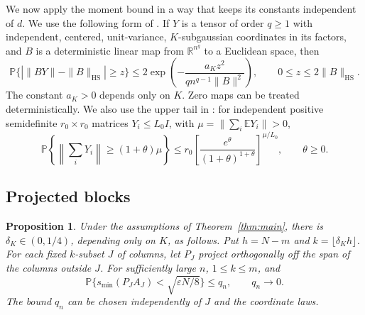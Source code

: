 \documentclass[11pt]{article}
\newtheorem{proposition}[theorem]{Proposition}
\newcommand{\R}{\mathbb R}
\newcommand{\E}{\mathbb E}
\newcommand{\Prob}{\mathbb P}
\newcommand{\HS}{\mathrm{HS}}
\begin{document}
We now apply the moment bound in a way that keeps its constants
independent of \(d\). We use the following form of
\cite[Theorem 1.4]{Vershynin}.
If \(Y\) is a tensor of order \(q\ge1\) with independent, centered,
unit-variance, \(K\)-subgaussian coordinates in its factors, and \(B\)
is a deterministic linear map from \(\R^{n^q}\) to a Euclidean
space, then
\begin{equation}\label{eq:tensor-concentration}
 \Prob\{|\|BY\|-\|B\|_{\HS}|\ge z\}
 \le2\exp\!\left(-\frac{a_K z^2}
                       {q n^{q-1}\|B\|^2}\right),
 \qquad 0\le z\le2\|B\|_{\HS}.
\end{equation}
The constant \(a_K>0\) depends only on \(K\).
Zero maps can be treated deterministically.
We also use the upper tail in
\cite[Theorem 5.1.1]{Tropp}: for independent positive semidefinite
\(r_0\times r_0\) matrices \(Y_i\le L_0I\), with
\(\mu=\|\sum_i\E Y_i\|>0\),
\begin{equation}\label{eq:cher}
 \Prob\!\left\{\left\|\sum_iY_i\right\|
                    \ge(1+\theta)\mu\right\}
 \le r_0\left[\frac{e^\theta}
                   {(1+\theta)^{1+\theta}}\right]^{\mu/L_0},
 \qquad \theta\ge0.
\end{equation}

\subsection{Projected blocks}

\begin{proposition}\label{prop:block}
Under the assumptions of Theorem~\ref{thm:main}, there is
\(\delta_K\in(0,1/4)\), depending only on \(K\), as follows.
Put \(h=N-m\) and \(k=\lfloor\delta_K h\rfloor\).
For each fixed \(k\)-subset \(J\) of columns, let \(P_J\) project
orthogonally off the span of the columns outside \(J\).
For sufficiently large \(n\), \(1\le k\le m\), and
\[
 \Prob\{s_{\min}(P_JA_J)<\sqrt{\varepsilon N/8}\}
 \le q_n,\qquad q_n\longrightarrow0.
\]
The bound \(q_n\) can be chosen independently of \(J\) and the
coordinate laws.
\end{proposition}
\end{document}
